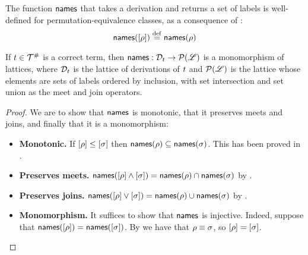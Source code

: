 \begin{remark}
The function $\mathsf{names}$ that takes a derivation and returns a set of labels
is well-defined for permutation-equivalence classes,
as a consequence of :
\[
  \mathsf{names}([\rho]) \overset{\mathrm{def}}{=} \mathsf{names}(\rho)
\]
\end{remark}

\begin{theorem}
If $t \in \mathcal{T}^{\mathtt{\#}}$ is a correct term,
then $\mathsf{names} : \mathcal{D}_{t} \to \mathcal{P}(\mathscr{L})$ is a monomorphism of lattices,
where $\mathcal{D}_{t}$ is the lattice of derivations of $t$
and $\mathcal{P}(\mathscr{L})$ is the lattice whose elements are sets of labels
ordered by inclusion, with set intersection and set union as
the meet and join operators.
\end{theorem}
\begin{proof}
We are to show that $\mathsf{names}$ is monotonic, that it preserves meets and joins,
and finally that it is a monomorphism:
\begin{itemize}
\item {\bf Monotonic.}
  If ${[\rho]} \leq {[\sigma]}$
  then $\mathsf{names}(\rho) \subseteq \mathsf{names}(\sigma)$.
  This has been proved in .
\item {\bf Preserves meets.}
  $\mathsf{names}({[\rho]} \land {[\sigma]}) =
   \mathsf{names}(\rho) \cap \mathsf{names}(\sigma)$
  by .
\item {\bf Preserves joins.}
  $\mathsf{names}({[\rho]} \lor {[\sigma]}) =
   \mathsf{names}(\rho) \cup \mathsf{names}(\sigma)$
  by .
\item {\bf Monomorphism.}
  It suffices to show that $\mathsf{names}$ is injective.
  Indeed, 
  suppose that $\mathsf{names}({[\rho]}) = \mathsf{names}({[\sigma]})$.
  By 
  we have that $\rho \equiv \sigma$,
  so
  ${[\rho]} = {[\sigma]}$.
\end{itemize}
\end{proof}

